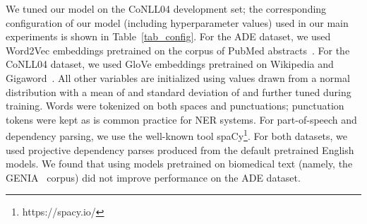 \documentclass{clv3}
\begin{document}
  \begin{table}[ht]
    \caption{Model configuration as tuned on the CoNLL04 development set.}
    \label{tab_config}
    \centering
    \end{table}

We tuned our model on the CoNLL04 development set; the corresponding configuration of our model (including hyperparameter values) used in our main experiments is shown in  Table~\ref{tab_config}. For the ADE dataset, we used Word2Vec embeddings pretrained on the corpus of PubMed abstracts~\cite{pyysalo2013distributional}. For the CoNLL04 dataset, we used GloVe  embeddings pretrained on Wikipedia and Gigaword~\cite{pennington2014glove}. All other variables are initialized using values drawn from a normal distribution with a mean of  and standard deviation of  and further tuned during training. Words were tokenized on both spaces and punctuations; punctuation tokens were kept as is common practice for NER systems. For part-of-speech and dependency parsing, we use the well-known tool  
spaCy\footnote{https://spacy.io/}. For both datasets, we used projective dependency parses produced from the default pretrained English models. We found that using models pretrained on biomedical text (namely, the GENIA~\cite{kim2003genia} corpus) did not improve performance on the ADE dataset.
\end{document}
